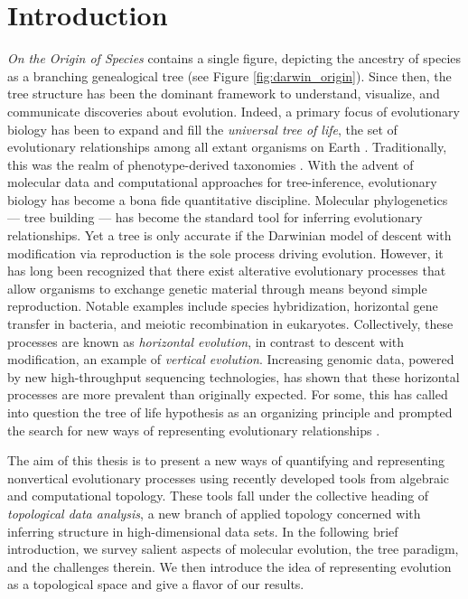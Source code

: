 \chapter{Introduction}
\label{ch:introduction}


\emph{On the Origin of Species} contains a single figure, depicting the ancestry of species as a branching genealogical tree \textcite{Darwin:1859uh} (see Figure \ref{fig:darwin_origin}).
Since then, the tree structure has been the dominant framework to understand, visualize, and communicate discoveries about evolution.
Indeed, a primary focus of evolutionary biology has been to expand and fill the \emph{universal tree of life}, the set of evolutionary relationships among all extant organisms on Earth \cite{Bowler:2003uz}.
Traditionally, this was the realm of phenotype-derived taxonomies \kje{[cite]}.
With the advent of molecular data and computational approaches for tree-inference, evolutionary biology has become a bona fide quantitative discipline.
Molecular phylogenetics --- tree building --- has become the standard tool for inferring evolutionary relationships.
Yet a tree is only accurate if the Darwinian model of descent with modification via reproduction is the sole process driving evolution.
However, it has long been recognized that there exist alterative evolutionary processes that allow organisms to exchange genetic material through means beyond simple reproduction.
Notable examples include species hybridization, horizontal gene transfer in bacteria, and meiotic recombination in eukaryotes.
Collectively, these processes are known as \emph{horizontal evolution}, in contrast to descent with modification, an example of \emph{vertical evolution}.
Increasing genomic data, powered by new high-throughput sequencing technologies, has shown that these horizontal processes are more prevalent than originally expected.
For some, this has called into question the tree of life hypothesis as an organizing principle and prompted the search for new ways of representing evolutionary relationships \cite{Doolittle:1999,OMalley:2011tu}.

The aim of this thesis is to present a new ways of quantifying and representing nonvertical evolutionary processes using recently developed tools from algebraic and computational topology.
These tools fall under the collective heading of \emph{topological data analysis}, a new branch of applied topology concerned with inferring structure in high-dimensional data sets.
In the following brief introduction, we survey salient aspects of molecular evolution, the tree paradigm, and the challenges therein.
We then introduce the idea of representing evolution as a topological space and give a flavor of our results.

